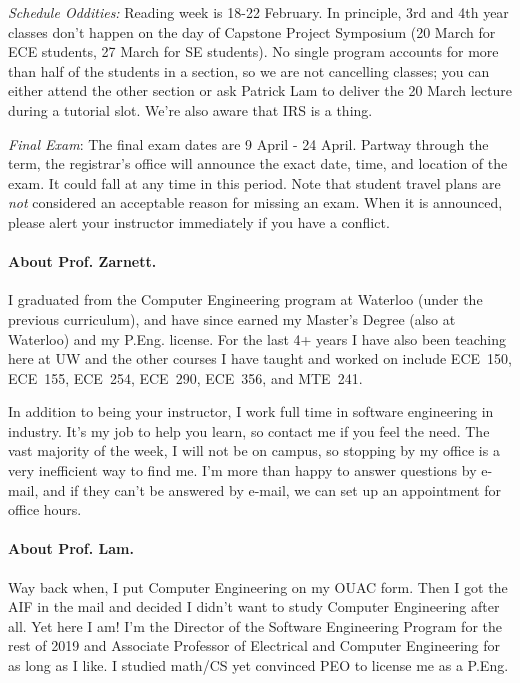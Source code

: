 \documentclass[letterpaper,10pt]{article}
\begin{document}
\textit{Schedule Oddities:} Reading week is 18-22 February. In principle, 3rd and 4th year classes don't happen on the day of Capstone Project Symposium (20 March for ECE students, 27 March for SE students). No single program accounts for more than half of the students in a section, so we are not cancelling classes; you can either attend the other section or ask Patrick Lam to deliver the 20 March lecture during a tutorial slot. We're also aware that IRS is a thing.

\textit{Final Exam}: The final exam dates are 9 April - 24 April. Partway through the term, the registrar's office will announce the exact date, time, and location of the exam. It could fall at any time in this period. Note that student travel plans are \emph{not} considered an acceptable reason for missing an exam. When it is announced, please alert your instructor immediately if you have a conflict.

\paragraph{About Prof. Zarnett.}
I graduated from the Computer Engineering program at Waterloo (under the previous curriculum), and have since earned my Master's Degree (also at Waterloo) and my P.Eng. license. For the last 4+ years I have also been teaching here at UW and the other courses I have taught and worked on include ECE~150, ECE~155, ECE~254, ECE~290, ECE~356, and MTE~241.

In addition to being your instructor, I work full time in software engineering in industry. It's my job to help you learn, so contact me if you feel the need. The vast majority of the week, I will not be on campus, so stopping by my office is a very inefficient way to find me. I'm more than happy to answer questions by e-mail, and if they can't be answered by e-mail, we can set up an appointment for office hours.

\paragraph{About Prof. Lam.}
Way back when, I put Computer Engineering on my OUAC form. Then I got the AIF in the mail and decided I didn't want to study Computer Engineering after all. Yet here I am! I'm the Director of the Software Engineering Program for the rest of 2019 and Associate Professor of Electrical and Computer Engineering for as long as I like. I studied math/CS yet convinced PEO to license me as a P.Eng.
\end{document}
